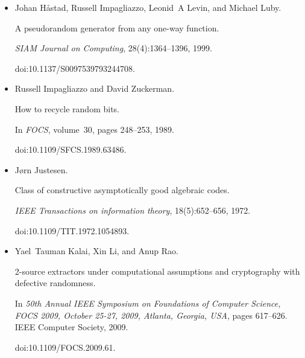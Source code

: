 \begin{itemize}
Venkatesan Guruswami and Atri Rudra.


Explicit codes achieving list decoding capacity: Error-correction
with optimal redundancy.


\emph{IEEE Transactions on Information Theory}, 54(1):135–150, 2008.


doi:10.1109/TIT.2007.911222.





\item[] 
[20]

Johan Håstad, Russell Impagliazzo, Leonid A Levin, and Michael Luby.


A pseudorandom generator from any one-way function.


\emph{SIAM Journal on Computing}, 28(4):1364–1396, 1999.


doi:10.1137/S0097539793244708.





\item[] 
[21]

Russell Impagliazzo and David Zuckerman.


How to recycle random bits.


In \emph{FOCS}, volume 30, pages 248–253, 1989.


doi:10.1109/SFCS.1989.63486.





\item[] 
[22]

Jørn Justesen.


Class of constructive asymptotically good algebraic codes.


\emph{IEEE Transactions on information theory}, 18(5):652–656, 1972.


doi:10.1109/TIT.1972.1054893.





\item[] 
[23]

Yael Tauman Kalai, Xin Li, and Anup Rao.


2-source extractors under computational assumptions and cryptography
with defective randomness.


In \emph{50th Annual IEEE Symposium on Foundations of Computer
Science, FOCS 2009, October 25-27, 2009, Atlanta, Georgia, USA}, pages
617–626. IEEE Computer Society, 2009.


doi:10.1109/FOCS.2009.61.






\end{itemize}
